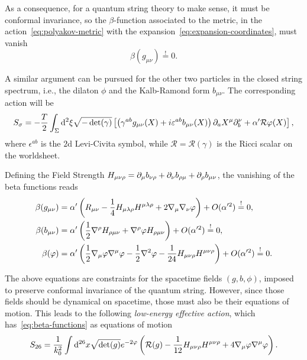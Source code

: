 As a consequence, for a quantum string theory to make sense, it must be conformal invariance, so the $\beta$-function associated to the metric, in the action~\eqref{eq:polyakov-metric} with the expansion~\eqref{eq:expansion-coordinates}, must vanish
\begin{equation}
    \beta(g_{\mu\nu}) \overset{!}{=} 0.
\end{equation} 

A similar argument can be pursued for the other two particles in the closed string spectrum, i.e., the dilaton $\phi$ and the Kalb-Ramond form $b_{\mu\nu}$. The corresponding action will be
\begin{equation}
    S_\sigma = -\frac{T}{2} \int_\Sigma \mathop{}\!\mathrm{d}^2 \xi \sqrt{-\det(\gamma)}\left[ \left( \gamma^{ab} g_{\mu\nu}(X) + i \varepsilon^{ab} b_{\mu\nu}(X) \right) \partial_a X^\mu \partial_b ^\nu + \alpha' \mathcal{R} \varphi(X) \right],
\end{equation}
where $\epsilon^{ab}$ is the $2$d Levi-Civita symbol, while $\mathcal{R} = \mathcal{R}(\gamma)$ is the Ricci scalar on the worldsheet.

Defining the Field Strength $H_{\mu\nu\rho} = \partial_\mu b_{\nu\rho} + \partial_\nu b_{\rho\mu} + \partial_\rho b_{\mu\nu}$, the vanishing of the beta functions reads
\begin{subequations}\label{eq:beta-functions}
\begin{align}
    \beta(g_{\mu\nu}) &= \alpha' \left( R_{\mu\nu} - \frac{1}{4} H_{\mu\lambda\rho} H^{\mu\lambda\rho} + 2 \nabla_\mu \nabla_\nu \varphi \right) + O(\alpha'^2)\overset{!}{=} 0,\\
    \beta(b_{\mu\nu}) &= \alpha' \left( \frac{1}{2} \nabla^\rho H_{\rho\mu\nu} + \nabla^\rho \varphi H_{\rho\mu\nu} \right) + O(\alpha'^2)\overset{!}{=} 0, \\
    \beta(\varphi) &= \alpha' \left( \frac{1}{2} \nabla_\mu \varphi \nabla^\mu \varphi - \frac{1}{2} \nabla^2 \varphi - \frac{1}{24} H_{\mu\nu\rho} H^{\mu\nu\rho} \right) + O(\alpha'^2)\overset{!}{=} 0.
\end{align}
\end{subequations}

The above equations are constraints for the spacetime fields $(g,b,\phi)$, imposed to preserve conformal invariance of the quantum string. However, since those fields should be dynamical on spacetime, those must also be their equations of motion. This leads to the following \emph{low-energy effective action}, which has~\eqref{eq:beta-functions} as equations of motion
\begin{equation}
    S_{26} = \frac{1}{k^2_0} \int \mathop{}\!\mathrm{d}^{26}x \sqrt{\det(g)} e^{-2\varphi} \left( \mathcal{R}(g) - \frac{1}{12} H_{\mu\nu\rho} H^{\mu\nu\rho} + 4 \nabla_\mu \varphi \nabla^\mu \varphi \right).
\end{equation}

